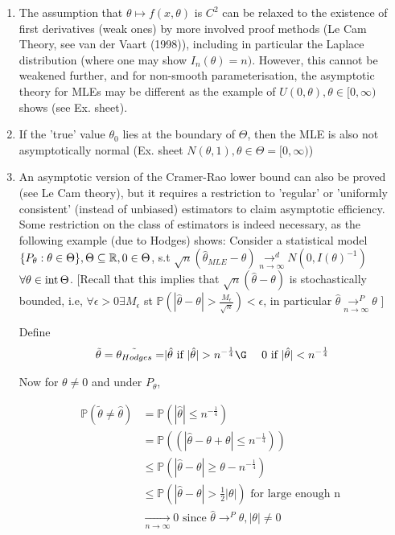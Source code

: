 \documentclass[a4paper]{article}
\begin{document}
\begin{remark}
	\begin{enumerate}
		\item The assumption that $\theta \mapsto f(x,\theta)$ is $C^2$ can be relaxed to the existence of first derivatives (weak ones) by more involved proof methods (Le Cam Theory, see van der Vaart (1998)), including in particular the Laplace distribution (where one may show $I_n(\theta) = n)$. However, this cannot be weakened further, and for non-smooth parameterisation, the asymptotic theory for MLEs may be different as the example of $U(0, \theta), \theta \in [0,\infty)$ shows (see Ex. sheet).

		\item If the 'true' value $\theta_0$ lies at the boundary of $\Theta$, then the MLE is also not asymptotically normal (Ex. sheet $N(\theta, 1), \theta \in \Theta = [0, \infty) $)

		\item An asymptotic version of the Cramer-Rao lower bound can also be proved (see Le Cam theory), but it requires a restriction to 'regular' or 'uniformly consistent' (instead of unbiased) estimators to claim asymptotic efficiency. Some restriction on the class of estimators is indeed necessary, as the following example (due to Hodges) shows:
			Consider a statistical model $\{P_{\theta} : \theta \in \Theta \}, \Theta \subseteq \mathbb{R}, 0 \in  \Theta$, s.t $\sqrt{n}(\hat{\theta}_{MLE} - \theta) \underset{n \to \infty}{\to ^{d}} N(0, I(\theta)^{-1})$ $ \forall \theta \in\operatorname{int}\Theta$. [Recall that this implies that $\sqrt{n}(\hat{\theta} - \theta) $ is stochastically bounded, i.e, $\forall \epsilon > 0 \exists M_{\epsilon}$ st $\mathbb{P}\left( |\hat{\theta} - \theta| > \frac{M_{\epsilon}}{\sqrt{n} } \right) < \epsilon$, in particular $\hat{\theta} \underset{n\to \infty}{\to ^{P}} \theta$ ]

			Define  \begin{align*}
				\tilde{\theta}=\tilde{\theta_{Hodges}} =  \mid &\hat{\theta} \text{ if } |\hat{\theta}| > n^{- \frac{1}{4}} \G\
				&0 \text{ if } |\hat{\theta}| < n^{- \frac{1}{4}}
		\end{align*} 

		Now for $\theta \neq 0$ and under $P_\theta$,

		 \begin{align*}
			 \mathbb{P}\left( \tilde{\theta} \neq \hat{\theta} \right) &= \mathbb{P}\left( |\hat{\theta}| \le n^{- \frac{1}{4}} \right) \\
			 &= \mathbb{P}\left( \left( |\hat{\theta} - \theta + \theta| \le n^{- \frac{1}{4}} \right)  \right) \\
			 &\le \mathbb{P}\left( |\hat{\theta} - \theta| \ge \theta - n^{- \frac{1}{4}} \right) \\
			 &\le \mathbb{P}\left( |\hat{\theta} - \theta| > \frac{1}{2}|\theta| \right) \text{ for large enough n } \\
			 &\underset{n\to \infty}{\to } 0 \text{ since  } \hat{\theta} \to ^{P} \theta, |\theta|\neq 0
		 \end{align*}


\end{enumerate}
\end{remark}
\end{document}
